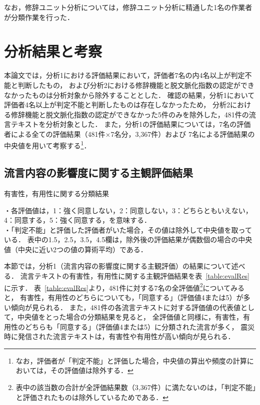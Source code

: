 \documentclass[japanese]{jnlp_1.4}
\begin{document}
なお，修辞ユニット分析については，修辞ユニット分析に精通した1名の作業者が分類作業を行った．



\section{分析結果と考察}
\label{sec:result}

本論文では，分析1における評価結果において，評価者7名の内4名以上が判定不能と判断したもの，
および分析2における修辞機能と脱文脈化指数の認定ができなかったものは分析対象から除外することとした．
確認の結果，分析1において評価者4名以上が判定不能と判断したものは存在しなかったため，
分析2における修辞機能と脱文脈化指数の認定ができなかった5件のみを除外した，481件の流言テキストを分析対象とした．
また，分析1の評価結果については，7名の評価者による全ての評価結果（481件×7名分，3,367件）および
7名による評価結果の中央値を用いて考察する\footnote{なお，評価者が「判定不能」と評価した場合，中央値の算出や頻度の計算においては，その評価値は除外する．}．


\subsection{流言内容の影響度に関する主観評価結果}
\label{sec:subjective}

\begin{table}[b]
\caption{有害性，有用性に関する分類結果}
\label{table:evalRes}

\par\vspace{0.5zw}\small
・各評価値は，1：強く同意しない，2：同意しない，3：どちらともいえない，4：同意する，5：強く同意する，を意味する．\\
・「判定不能」と評価した評価者がいた場合，その値は除外して中央値を取っている．
表中の1.5，2.5，3.5，4.5欄は，除外後の評価結果が偶数個の場合の中央値（中央に近い2つの値の算術平均）である．\par
\end{table}

本節では，分析1（流言内容の影響度に関する主観評価）の結果について述べる．
流言テキストの有害性，有用性に関する主観評価結果を表~\ref{table:evalRes}に示す．
表~\ref{table:evalRes}より，481件に対する7名の全評価値\footnote{表中の該当数の合計が全評価結果数（3,367件）に満たないのは，「判定不能」と評価されたものは除外しているためである．}についてみると，
有害性，有用性のどちらについても，「同意する」（評価値4または5）が多い傾向が見られる．
また，481件の各流言テキストに対する評価値の代表値として，中央値をとった場合の分類結果を見ると，
全評価値と同様に，有害性，有用性のどちらも「同意する」（評価値4または5）に分類された流言が多く，
震災時に発信された流言テキストは，有害性や有用性が高い傾向が見られる．
\end{document}
